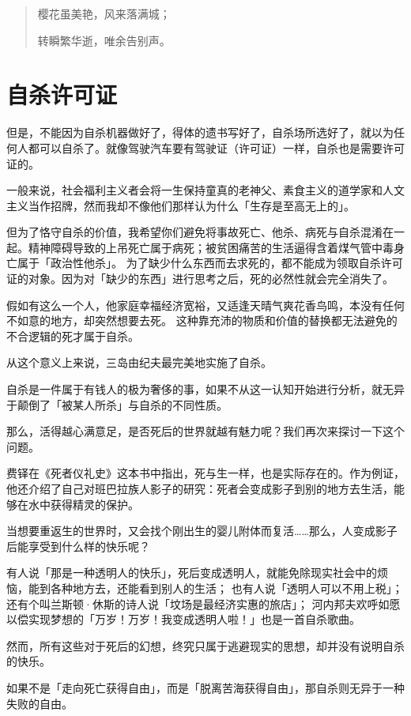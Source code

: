 \documentclass[UTF8]{ctexart}
\begin{document}
\begin{verse}
樱花虽美艳，风来落满城；

转瞬繁华逝，唯余告别声。
\end{verse}

\section{自杀许可证}

但是，不能因为自杀机器做好了，得体的遗书写好了，自杀场所选好了，就以为任何人都可以自杀了。就像驾驶汽车要有驾驶证（许可证）一样，自杀也是需要许可证的。

一般来说，社会福利主义者会将一生保持童真的老神父、素食主义的道学家和人文主义当作招牌，然而我却不像他们那样认为什么「生存是至高无上的」。

但为了恪守自杀的价值，我希望你们避免将事故死亡、他杀、病死与自杀混淆在一起。精神障碍导致的上吊死亡属于病死；被贫困痛苦的生活逼得含着煤气管中毒身亡属于「政治性他杀」。
为了缺少什么东西而去求死的，都不能成为领取自杀许可证的对象。因为对「缺少的东西」进行思考之后，死的必然性就会完全消失了。

假如有这么一个人，他家庭幸福经济宽裕，又适逢天晴气爽花香鸟鸣，本没有任何不如意的地方，却突然想要去死。
这种靠充沛的物质和价值的替换都无法避免的不合逻辑的死才属于自杀。

从这个意义上来说，三岛由纪夫最完美地实施了自杀。

自杀是一件属于有钱人的极为奢侈的事，如果不从这一认知开始进行分析，就无异于颠倒了「被某人所杀」与自杀的不同性质。

那么，活得越心满意足，是否死后的世界就越有魅力呢？我们再次来探讨一下这个问题。

费铎在《死者仪礼史》这本书中指出，死与生一样，也是实际存在的。作为例证，他还介绍了自己对班巴拉族人影子的研究：死者会变成影子到别的地方去生活，能够在水中获得精灵的保护。

当想要重返生的世界时，又会找个刚出生的婴儿附体而复活……那么，人变成影子后能享受到什么样的快乐呢？

有人说「那是一种透明人的快乐」，死后变成透明人，就能免除现实社会中的烦恼，能到各种地方去，还能看到别人的生活；
也有人说「透明人可以不用上税」；
还有个叫兰斯顿·休斯的诗人说「坟场是最经济实惠的旅店」；
河内邦夫欢呼如愿以偿实现梦想的「万岁！万岁！我变成透明人啦！」也是一首自杀歌曲。

然而，所有这些对于死后的幻想，终究只属于逃避现实的思想，却并没有说明自杀的快乐。

如果不是「走向死亡获得自由」，而是「脱离苦海获得自由」，那自杀则无异于一种失败的自由。
\end{document}
